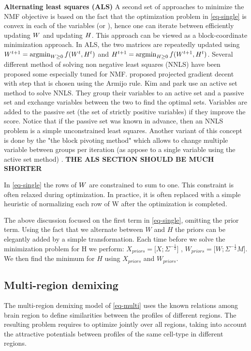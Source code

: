 {\bf{Alternating least squares} (ALS)} A second set of approaches to minimize the NMF objective is based on the fact that the optimization problem in \eqref{eq-single} is convex in each of the variables \W (or \Htext), hence one can iterate between efficiently updating $W$ and updating ${H}$. This approach can be viewed as a block-coordinate minimization approach. In ALS, the two matrices are  repeatedly updated using $ W^{t+1} = \argmin_{W \geq 0 } f(W^t, H^t)$ and $H^{t+1} = \argmin_{H \geq 0 } f(W^{t+1},H^t)$. Several different method of solving non negative least squares (NNLS) have been proposed some especially tuned for NMF. \citet{lin2007projected} proposed projected gradient decent with step that is chosen using the Armijo rule. 
Kim and park \cite{kim2008activeset,kim2011fast} use an active set method to solve NNLS. They group their variables to an active set and a passive set and 
exchange variables between the two to find the optimal sets. Variables are added to the passive set (the set of strictly positive variables) if they improve the score. Notice that if the passive set was known in advance, then an NNLS problem is a simple unconstrained least squares. Another variant of this concept is done by the "the block pivoting method" which allows to change multiple variable between groups per iteration (as appose to a single variable using the active set method) \cite{kim2011fast}. {\bf{THE ALS SECTION SHOULD BE MUCH SHORTER}}

In \eqref{eq-single} the rows of $W$ are constrained to sum to one. This constraint is often relaxed during optimization. In practice, it is often replaced with a simple heuristic of normalizing each row of W after the optimization is completed. 

The above discussion focused on the first term in \eqref{eq-single}, omitting the prior term. 
Using the fact that we alternate between $W$ and $H$ the priors can be elegantly added by a simple transformation. Each time before we solve the minimization problem for H we perform:
$ X_{priors} = \Big[ X ;\Sigma^{-\frac{1}{2}} \Big]  $  ,  $ W_{priors} = \Big[  W ; \Sigma^{-\frac{1}{2}} M \Big]  $. We then find the minimum for $H$ using $X_{priors} $ and $W_{priors} $. 



\subsection{Multi-region demixing}
The multi-region demixing model of \eqref{eq-multi} uses the known relations among brain region to define similarities between the profiles of different regions. The resulting problem requires to optimize jointly over all regions, taking into account the attractive potentials between profiles of the same cell-type in different regions. 


